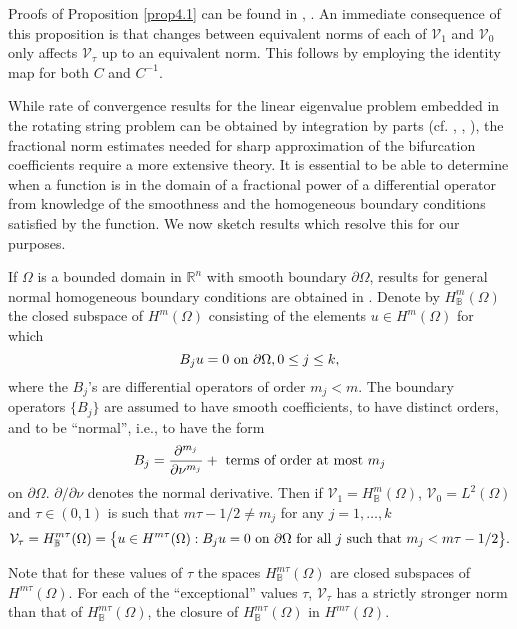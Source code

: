 \documentclass[final]{siamltex}
\numberwithin{equation}{section}
\begin{document}
Proofs of Proposition \ref{prop4.1} can be found in \cite{AAH},
\cite{Lions-Magenes}. An immediate consequence of this proposition is that changes between equivalent norms of each of $\mathcal{V}_{1}$ and $\mathcal{V}_{0}$ only affects $\mathcal{V}_{\tau}$ up to an equivalent norm. This follows by employing the identity
map for both $C$ and $C^{-1}$.

While rate of convergence results for the linear eigenvalue problem embedded
in the rotating string problem can be obtained by integration by
parts (cf. \cite{Bernardi-Maday}, \cite{Birk-Fix}, \cite {Boyd}), the fractional norm estimates needed for sharp approximation of the bifurcation coefficients require a more extensive theory. It is essential to be able to determine when a function is in the domain of a fractional power of a differential operator from knowledge of the smoothness and the homogeneous boundary conditions satisfied by the function. We now sketch results which resolve this for our purposes.

If $\Omega$ is a bounded domain in ${\mathbb{R}}^n$ with smooth boundary $\partial \Omega$, results for general normal homogeneous boundary conditions are obtained in \cite{Grisvard}. Denote by
$H_{\mathbb{B}}^m (\Omega)$ the closed subspace of $H^m(\Omega)$ consisting of the elements $u \in H^m(\Omega)$ for which
\begin{equation} \notag
B_j u = 0 \text{ on } \partial \Omega, 0 \le j \le k,
\end{equation}
where the $B_j$'s are differential operators of order $m_j <m$. The boundary operators $\{B_j\}$ are assumed to have smooth coefficients, to have distinct orders, and to be ``normal'', i.e., to have the form
\begin{equation} \notag
B_j  = \frac{\partial^{m_j} }{\partial{\nu}^{m_j}} + \text{ terms of order at most  } m_j
\end{equation}
on $\partial \Omega$. $\partial/\partial \nu$ denotes the normal derivative. Then
if $\mathcal{V}_1 = H_{\mathbb{B}}^m (\Omega)$, $\mathcal{V}_0 = L^2 (\Omega)$ and
$\tau \in (0,1)$ is such that $m \tau -1/2 \neq m_j$ for any $j=1, \ldots, k$
{\small \begin{equation} \notag
\mathcal{V}_{\tau} = H_{\mathbb{B}}^{m \tau} (\Omega) = \big \{ u \in
H^{m \tau} (\Omega): B_j u=0 \text{ on } \partial \Omega \text{ for all } j
\text{ such that } m_j<m \tau -1/2 \big \}.
\end{equation}}

\noindent Note that for these values of $\tau$ the spaces $H_{\mathbb{B}}^{m \tau} (\Omega)$ are closed subspaces of $H^{m \tau} (\Omega)$. For each of the ``exceptional'' values $\tau$, $\mathcal{V}_{\tau}$ has a strictly stronger norm than that of $H_{\mathbb{B}}^{m \tau} (\Omega)$, the closure of $H_{\mathbb{B}}^{m \tau} (\Omega)$ in $H^{m \tau} (\Omega)$.
\end{document}
